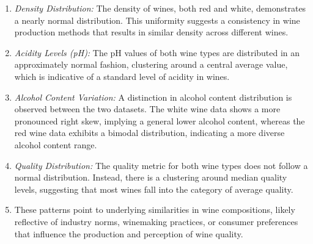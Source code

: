 \documentclass{article}
\begin{document}
\begin{enumerate}
\begin{enumerate}
            \item \textit{Density Distribution:} The density of wines, both red and white, demonstrates a nearly normal distribution. This uniformity suggests a consistency in wine production methods that results in similar density across different wines.

            \item \textit{Acidity Levels (pH):} The pH values of both wine types are distributed in an approximately normal fashion, clustering around a central average value, which is indicative of a standard level of acidity in wines.

            \item \textit{Alcohol Content Variation:} A distinction in alcohol content distribution is observed between the two datasets. The white wine data shows a more pronounced right skew, implying a general lower alcohol content, whereas the red wine data exhibits a bimodal distribution, indicating a more diverse alcohol content range.

            \item \textit{Quality Distribution:} The quality metric for both wine types does not follow a normal distribution. Instead, there is a clustering around median quality levels, suggesting that most wines fall into the category of average quality.

            \item These patterns point to underlying similarities in wine compositions, likely reflective of industry norms, winemaking practices, or consumer preferences that influence the production and perception of wine quality.
        \end{enumerate}


\end{enumerate}
\end{document}
